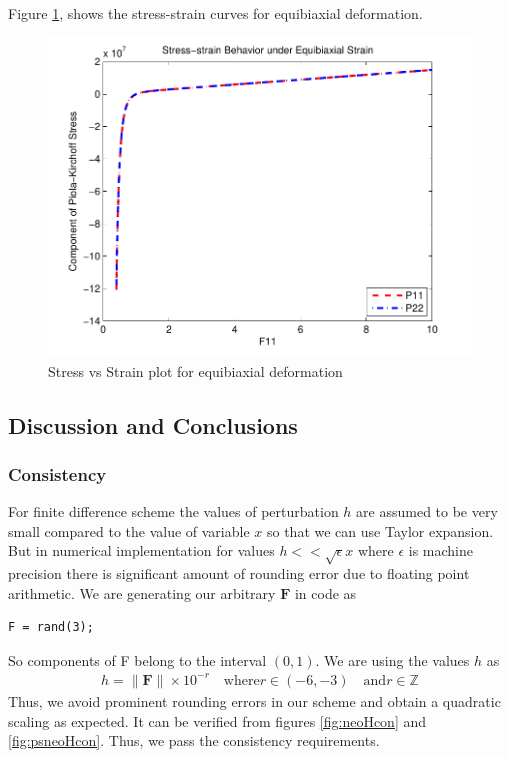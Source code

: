 \message{ !name(p1_2.tex)}\documentclass[../main.tex]{subfiles}
\begin{document}
Figure \ref{fig:equibiaxial}, shows the stress-strain curves for
equibiaxial deformation.
\begin{figure}[h]
  \centering
  \includegraphics{./img/EquiBiaxial_1.pdf}
  \caption{Stress vs Strain plot for equibiaxial deformation}
  \label{fig:equibiaxial}
\end{figure}


\subsection{Discussion and Conclusions}
\subsubsection{Consistency}
For finite difference scheme the values of perturbation $h$ are
assumed to be very small compared to the value of variable $x$ so that
we can use Taylor expansion. But in numerical implementation for
values $h << \sqrt{\epsilon}x$ where $\epsilon$ is machine precision
there is significant amount of rounding error due to floating point
arithmetic. We are generating our arbitrary $\mathbf{F}$ in code as
\begin{lstlisting}[frame=single]
  F = rand(3);
\end{lstlisting}
So components of F belong to the interval $(0,1)$. We are using the
values $h$ as
\begin{align*}
  h = \lVert\mathbf{F}\rVert\times10^{-r}\quad\text{where} r\in(-6,-3)\quad \text{and} r\in\mathbb{Z}
\end{align*}
Thus, we avoid prominent rounding errors in our scheme and obtain a
quadratic scaling as expected. It can be verified from figures
\ref{fig:neoHcon} and \ref{fig:psneoHcon}. Thus, we pass the
consistency requirements.
\end{document}

